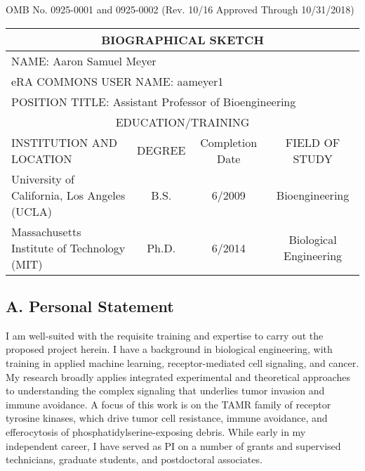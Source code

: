 \documentclass[11pt]{article}
\begin{document}
\setlength\parindent{0pt}

\renewcommand{\arraystretch}{1.2}

\begin{flushright}
\footnotesize
	OMB No. 0925-0001 and 0925-0002 (Rev. 10/16 Approved Through 10/31/2018)
\end{flushright}


\begin{tabular}{l|c|c|c}
  \hline
  \multicolumn{4}{c}{\textbf{BIOGRAPHICAL SKETCH}} \\
  \hline
  \multicolumn{4}{l}{NAME: Aaron Samuel Meyer} \\
  \hline
  \multicolumn{4}{l}{eRA COMMONS USER NAME: aameyer1} \\
  \hline
  \multicolumn{4}{l}{POSITION TITLE: Assistant Professor of Bioengineering} \\
  \hline
  \multicolumn{4}{c}{EDUCATION/TRAINING} \\
  \hline
  INSTITUTION AND LOCATION & DEGREE & Completion Date & FIELD OF STUDY \\
  \hline
  University of California, Los Angeles (UCLA) \hspace{40pt} & B.S. & 6/2009 & Bioengineering \\
  Massachusetts Institute of Technology (MIT) & Ph.D. & 6/2014 & Biological Engineering \\
  
\end{tabular}


\vspace{20pt}

\subsection{A. Personal Statement}


I am well-suited with the requisite training and expertise to carry out the proposed project herein. I have a background in biological engineering, with training in applied machine learning, receptor-mediated cell signaling, and cancer. My research broadly applies integrated experimental and theoretical approaches to understanding the complex signaling that underlies tumor invasion and immune avoidance. A focus of this work is on the TAMR family of receptor tyrosine kinases, which drive tumor cell resistance, immune avoidance, and efferocytosis of phosphatidylserine-exposing debris. While early in my independent career, I have served as PI on a number of grants and supervised technicians, graduate students, and postdoctoral associates.
\end{document}
